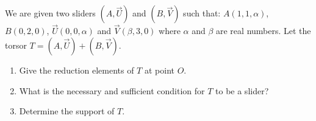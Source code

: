 \documentclass[12pt]{article}
\begin{document}
\section{}

We are given two sliders $(A, \vec{U})$ and $(B, \vec{V})$ such that: $A(1, 1, \alpha)$, $B(0, 2, 0)$, $\vec{U}(0, 0, \alpha)$ and $\vec{V}(\beta, 3, 0)$ where $\alpha$ and $\beta$ are real numbers. Let the torsor $T = (A, \vec{U}) + (B, \vec{V})$.

\begin{enumerate}
    \item Give the reduction elements of $T$ at point $O$.
    \item What is the necessary and sufficient condition for $T$ to be a slider?
    \item Determine the support of $T$.
\end{enumerate}
\end{document}

